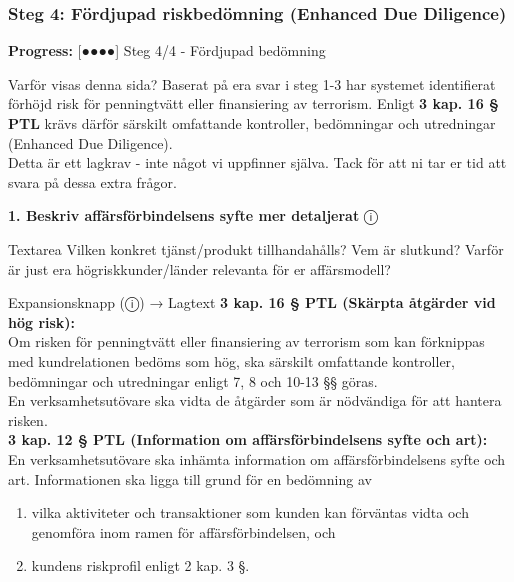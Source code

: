 \documentclass[10pt]{beamer}
\begin{document}
\begin{frame}[label=riskfragor-steg4]
  \frametitle{Steg 4: Fördjupad riskbedömning (Enhanced Due Diligence)}
  
  \small
  \textbf{Progress:} [●●●●] Steg 4/4 - Fördjupad bedömning
  
  \vspace{0.3cm}
  
  \begin{alertblock}{Varför visas denna sida?}
    \tiny Baserat på era svar i steg 1-3 har systemet identifierat förhöjd risk för penningtvätt eller finansiering av terrorism.
    Enligt \textbf{3 kap. 16 § PTL} krävs därför särskilt omfattande kontroller, bedömningar och utredningar (Enhanced Due Diligence).\\[0.1cm]
    \tiny Detta är ett lagkrav - inte något vi uppfinner själva. Tack för att ni tar er tid att svara på dessa extra frågor.
  \end{alertblock}

  \vspace{0.4cm}


  \textbf{1. Beskriv affärsförbindelsens syfte mer detaljerat} \hspace{0.3cm} ⓘ\\
  \begin{block}{Textarea}
    \tiny Vilken konkret tjänst/produkt tillhandahålls? Vem är slutkund? 
    Varför är just era högriskkunder/länder relevanta för er affärsmodell?
  \end{block}
  \begin{alertblock}{Expansionsknapp (ⓘ) → Lagtext}
    \tiny \textbf{3 kap. 16 § PTL (Skärpta åtgärder vid hög risk):}\\
    \tiny Om risken för penningtvätt eller finansiering av terrorism som kan förknippas med kundrelationen
    bedöms som hög, ska särskilt omfattande kontroller, bedömningar och utredningar enligt 7, 8 och 10-13 §§ göras.\\
    \tiny En verksamhetsutövare ska vidta de åtgärder som är nödvändiga för att hantera risken.\\[0.1cm]
    
    \tiny \textbf{3 kap. 12 § PTL (Information om affärsförbindelsens syfte och art):}\\
    \tiny En verksamhetsutövare ska inhämta information om affärsförbindelsens syfte och art.
    Informationen ska ligga till grund för en bedömning av
    \begin{enumerate}
      \item vilka aktiviteter och transaktioner som kunden kan förväntas vidta och genomföra inom ramen för affärsförbindelsen, och
      \item kundens riskprofil enligt 2 kap. 3 §.
    \end{enumerate}
    \vspace{0.1cm}
    

\end{alertblock}
\end{frame}
\end{document}
